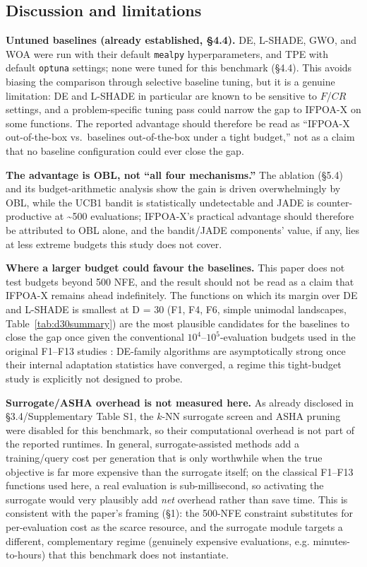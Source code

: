 \documentclass[preprint,12pt]{elsarticle}
\begin{document}
\subsection{Discussion and limitations}
\label{subsec5-6}

\textbf{Untuned baselines (already established, \S4.4).} DE, L-SHADE, GWO, and WOA were run with their default \texttt{mealpy} hyperparameters, and TPE with default \texttt{optuna} settings; none were tuned for this benchmark (\S4.4). This avoids biasing the comparison through selective baseline tuning, but it is a genuine limitation: DE and L-SHADE in particular are known to be sensitive to $F$/$CR$ settings, and a problem-specific tuning pass could narrow the gap to IFPOA-X on some functions. The reported advantage should therefore be read as ``IFPOA-X out-of-the-box vs.\ baselines out-of-the-box under a tight budget,'' not as a claim that no baseline configuration could ever close the gap.

\textbf{The advantage is OBL, not ``all four mechanisms.''} The ablation (\S5.4) and its budget-arithmetic analysis show the gain is driven overwhelmingly by OBL, while the UCB1 bandit is statistically undetectable and JADE is counter-productive at \textasciitilde500 evaluations; IFPOA-X's practical advantage should therefore be attributed to OBL alone, and the bandit/JADE components' value, if any, lies at less extreme budgets this study does not cover.

\textbf{Where a larger budget could favour the baselines.} This paper does not test budgets beyond 500 NFE, and the result should not be read as a claim that IFPOA-X remains ahead indefinitely. The functions on which its margin over DE and L-SHADE is smallest at D = 30 (F1, F4, F6, simple unimodal landscapes, Table~\ref{tab:d30summary}) are the most plausible candidates for the baselines to close the gap once given the conventional $10^4$--$10^5$-evaluation budgets used in the original F1--F13 studies \cite{yao1999evolutionary}: DE-family algorithms are asymptotically strong once their internal adaptation statistics have converged, a regime this tight-budget study is explicitly not designed to probe.

\textbf{Surrogate/ASHA overhead is not measured here.} As already disclosed in \S3.4/Supplementary Table S1, the $k$-NN surrogate screen and ASHA pruning were disabled for this benchmark, so their computational overhead is not part of the reported runtimes. In general, surrogate-assisted methods add a training/query cost per generation \cite{jin2011surrogate,chugh2018surrogate} that is only worthwhile when the true objective is far more expensive than the surrogate itself; on the classical F1--F13 functions used here, a real evaluation is sub-millisecond, so activating the surrogate would very plausibly add \emph{net} overhead rather than save time. This is consistent with the paper's framing (\S1): the 500-NFE constraint substitutes for per-evaluation cost as the scarce resource, and the surrogate module targets a different, complementary regime (genuinely expensive evaluations, e.g. minutes-to-hours) that this benchmark does not instantiate.
\end{document}
